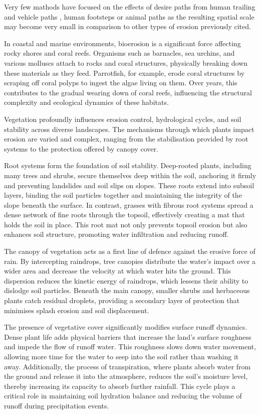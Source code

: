Very few mathods have focused on the effects of desire paths from human trailing and vehicle paths \cite{Cordonnier2018,Jaiswal2019}, human footsteps \cite{Alvarado2024} or animal paths \cite{Ecormier-Nocca2021} as the resulting spatial scale may become very small in comparison to other types of erosion previously cited.

In coastal and marine environments, bioerosion is a significant force affecting rocky shores and coral reefs. Organisms such as barnacles, sea urchins, and various molluscs attach to rocks and coral structures, physically breaking down these materials as they feed. Parrotfish, for example, erode coral structures by scraping off coral polyps to ingest the algae living on them. Over years, this contributes to the gradual wearing down of coral reefs, influencing the structural complexity and ecological dynamics of these habitats.

Vegetation profoundly influences erosion control, hydrological cycles, and soil stability across diverse landscapes. The mechanisms through which plants impact erosion are varied and complex, ranging from the stabilisation provided by root systems to the protection offered by canopy cover.

Root systems form the foundation of soil stability. Deep-rooted plants, including many trees and shrubs, secure themselves deep within the soil, anchoring it firmly and preventing landslides and soil slips on slopes. These roots extend into subsoil layers, binding the soil particles together and maintaining the integrity of the slope beneath the surface. In contrast, grasses with fibrous root systems spread a dense network of fine roots through the topsoil, effectively creating a mat that holds the soil in place. This root mat not only prevents topsoil erosion but also enhances soil structure, promoting water infiltration and reducing runoff.

The canopy of vegetation acts as a first line of defence against the erosive force of rain. By intercepting raindrops, tree canopies distribute the water's impact over a wider area and decrease the velocity at which water hits the ground. This dispersion reduces the kinetic energy of raindrops, which lessens their ability to dislodge soil particles. Beneath the main canopy, smaller shrubs and herbaceous plants catch residual droplets, providing a secondary layer of protection that minimises splash erosion and soil displacement.

The presence of vegetative cover significantly modifies surface runoff dynamics. Dense plant life adds physical barriers that increase the land's surface roughness and impede the flow of runoff water. This roughness slows down water movement, allowing more time for the water to seep into the soil rather than washing it away. Additionally, the process of transpiration, where plants absorb water from the ground and release it into the atmosphere, reduces the soil's moisture level, thereby increasing its capacity to absorb further rainfall. This cycle plays a critical role in maintaining soil hydration balance and reducing the volume of runoff during precipitation events.

